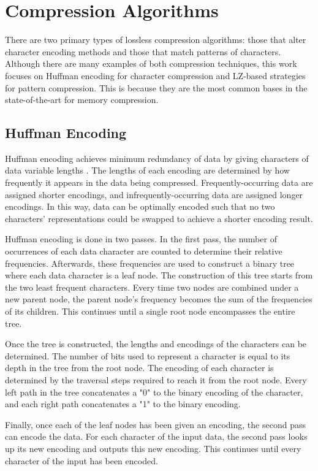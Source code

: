 \documentclass[doublespace,draft,nopageskip]{VTthesis} %
\begin{document}
\section{Compression Algorithms}\label{se:compression_algorithms}
There are two primary types of lossless compression algorithms: those that alter character encoding methods and those that match patterns of characters. Although there are many examples of both compression techniques, this work focuses on Huffman encoding for character compression and LZ-based strategies for pattern compression. This is because they are the most common bases in the state-of-the-art for memory compression.

\subsection{Huffman Encoding}\label{ss:huffman_encoding}
Huffman encoding achieves minimum redundancy of data by giving characters of data variable lengths \cite{huffman}. The lengths of each encoding are determined by how frequently it appears in the data being compressed. Frequently-occurring data are assigned shorter encodings, and infrequently-occurring data are assigned longer encodings. In this way, data can be optimally encoded such that no two characters' representations could be swapped to achieve a shorter encoding result. 

Huffman encoding is done in two passes. In the first pass, the number of occurrences of each data character are counted to determine their relative frequencies. Afterwards, these frequencies are used to construct a binary tree where each data character is a leaf node. The construction of this tree starts from the two least frequent characters. Every time two nodes are combined under a new parent node, the parent node's frequency becomes the sum of the frequencies of its children. This continues until a single root node encompasses the entire tree.

Once the tree is constructed, the lengths and encodings of the characters can be determined. The number of bits used to represent a character is equal to its depth in the tree from the root node. The encoding of each character is determined by the traversal steps required to reach it from the root node. Every left path in the tree concatenates a "0" to the binary encoding of the character, and each right path concatenates a "1" to the binary encoding.

Finally, once each of the leaf nodes has been given an encoding, the second pass can encode the data. For each character of the input data, the second pass looks up its new encoding and outputs this new encoding. This continues until every character of the input has been encoded.
\end{document}

